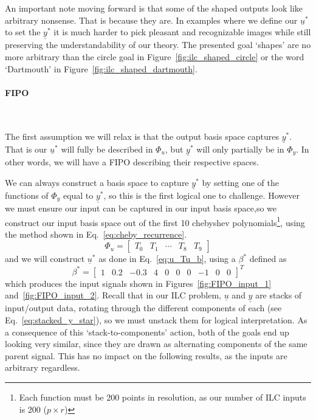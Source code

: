 An important note moving forward is that some of the shaped outputs look like arbitrary nonsense. That is because they are. In examples where we define our $\underline{u}^\ast$ to set the $\underline{y}^\ast$ it is much harder to pick pleasant and recognizable images while still preserving the understandability of our theory. The presented goal `shapes' are no more arbitrary than the circle goal in Figure~\ref{fig:ilc_shaped_circle} or the word `Dartmouth' in Figure~\ref{fig:ilc_shaped_dartmouth}. 

\FloatBarrier\paragraph{{FIPO}}
~\label{par:fipo}

The first assumption we will relax is that the output basis space captures $\underline{y}^\ast$. That is our $\underline{u}^\ast$ will fully be described in $\Phi_u$, but $\underline{y}^\ast$ will only partially be in $\Phi_y$. In other words, we will have a \ac{FIPO} describing their respective spaces.

We can always construct a basis space to capture $\underline{y}^\ast$ by setting one of the functions of $\Phi_y$ equal to $\underline{y}^\ast$, so this is the first logical one to challenge. However we must ensure our input can be captured in our input basis space,so we construct our input basis space out of the first 10 chebyshev polynomials\footnote{Each function must be 200 points in resolution,  as our number of ILC inputs is 200 ($p \times r$)}, using the method shown in Eq.~\ref{eq:cheby_recurrence}.
\begin{equation}
    \Phi_u = 
    \begin{bmatrix}
        T_0 & T_1 & \cdots & T_8 & T_9
    \end{bmatrix}
    \label{eq:Tu_in_cheby}
\end{equation}
and we will construct $\underline{u}^\ast$ as done in Eq.~\ref{eq:u_Tu_b}, using a $\beta^\ast$ defined as
\begin{equation}
    \beta^\ast = {\begin{bmatrix}1 & 0.2 & -0.3 & 4 & 0 & 0 & 0 & -1 & 0 & 0\end{bmatrix}}^T
    \label{eq:beta_star_in_basis}
\end{equation}
which produces the input signals shown in Figures~\ref{fig:FIPO_input_1} and~\ref{fig:FIPO_input_2}. Recall that in our ILC problem, $\underline{u}$ and $\underline{y}$ are stacks of input/output data, rotating through the different components of each (see Eq.~\ref{eq:stacked_y_star}), so we must unstack them for logical interpretation. As a consequence of this `stack-to-components' action, both of the goals end up looking very similar, since they are drawn as alternating components of the same parent signal. This has no impact on the following results, as the inputs are arbitrary regardless.

